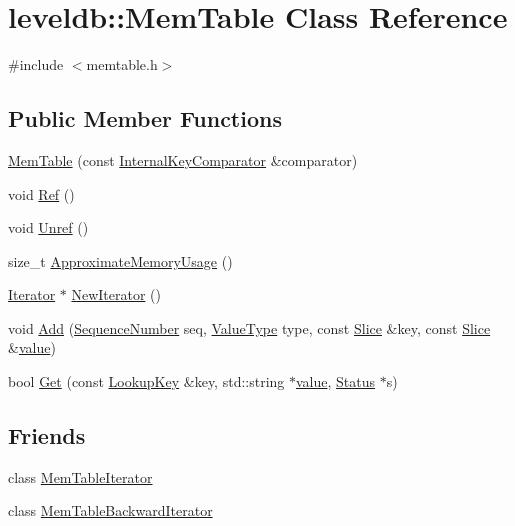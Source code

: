 \hypertarget{classleveldb_1_1_mem_table}{}\section{leveldb\+:\+:Mem\+Table Class Reference}
\label{classleveldb_1_1_mem_table}


{\ttfamily \#include $<$memtable.\+h$>$}

\subsection*{Public Member Functions}
\begin{DoxyCompactItemize}
\item 
\hyperlink{classleveldb_1_1_mem_table_a23add92a4a6e5d1521f3b6695dba5c2d}{Mem\+Table} (const \hyperlink{classleveldb_1_1_internal_key_comparator}{Internal\+Key\+Comparator} \&comparator)
\item 
void \hyperlink{classleveldb_1_1_mem_table_a332484cffd2ebc7d6a51f22eeeeeb71b}{Ref} ()
\item 
void \hyperlink{classleveldb_1_1_mem_table_a5dcbf17d1477e6098a30dadd0745cfb2}{Unref} ()
\item 
size\+\_\+t \hyperlink{classleveldb_1_1_mem_table_a667a1ada274201f0bdd3615baf1bd882}{Approximate\+Memory\+Usage} ()
\item 
\hyperlink{classleveldb_1_1_iterator}{Iterator} $\ast$ \hyperlink{classleveldb_1_1_mem_table_a396b8ba5e2ea0de25b666026f3b9235f}{New\+Iterator} ()
\item 
void \hyperlink{classleveldb_1_1_mem_table_a37bec80954badb2354426aa175e9371f}{Add} (\hyperlink{namespaceleveldb_a5481ededd221c36d652c371249f869fa}{Sequence\+Number} seq, \hyperlink{namespaceleveldb_acc038cb0d608414730cafa459a4ba866}{Value\+Type} type, const \hyperlink{classleveldb_1_1_slice}{Slice} \&key, const \hyperlink{classleveldb_1_1_slice}{Slice} \&\hyperlink{cache_8cc_a0f61d63b009d0880a89c843bd50d8d76}{value})
\item 
bool \hyperlink{classleveldb_1_1_mem_table_af94f80a5909a440d0675afa68f8765c5}{Get} (const \hyperlink{classleveldb_1_1_lookup_key}{Lookup\+Key} \&key, std\+::string $\ast$\hyperlink{cache_8cc_a0f61d63b009d0880a89c843bd50d8d76}{value}, \hyperlink{classleveldb_1_1_status}{Status} $\ast$s)
\end{DoxyCompactItemize}
\subsection*{Friends}
\begin{DoxyCompactItemize}
\item 
class \hyperlink{classleveldb_1_1_mem_table_ad6cb602bccb9af617c8cb348ae693d4a}{Mem\+Table\+Iterator}
\item 
class \hyperlink{classleveldb_1_1_mem_table_ab6427243fb396d56604898725f9f2327}{Mem\+Table\+Backward\+Iterator}
\end{DoxyCompactItemize}


